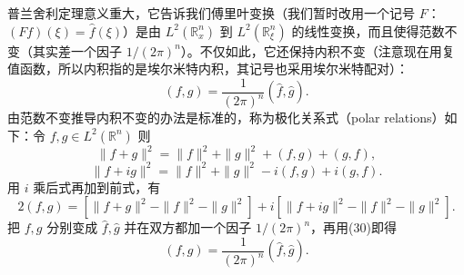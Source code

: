 普兰舍利定理意义重大，它告诉我们傅里叶变换（我们暂时改用一个记号 $F$：$(Ff)(\xi)=\widehat f(\xi)$）是由 $L^2(\mathbb R_x^n)$ 到 $L^2(\mathbb R_\xi^n)$ 的线性变换，而且使得范数不变（其实差一个因子 $1/(2\pi)^n$）。不仅如此，它还保持内积不变（注意现在用复值函数，所以内积指的是埃尔米特内积，其记号也采用埃尔米特配对）：
\begin{equation}
 (f,g)=\frac1{(2\pi)^n}(\widehat f,\widehat g).
 \tag{31}
\end{equation}
由范数不变推导内积不变的办法是标准的，称为极化关系式（polar relations）如下：令 $f,g\in L^2(\mathbb R^n)$ 则
\[
 \|f+g\|^2=\|f\|^2+\|g\|^2+(f,g)+(g,f),
\]
\[
 \|f+ig\|^2=\|f\|^2+\|g\|^2-i(f,g)+i(g,f).
\]
用 $i$ 乘后式再加到前式，有
\[
 2(f,g)=[\|f+g\|^2-\|f\|^2-\|g\|^2]
 +i[\|f+ig\|^2-\|f\|^2-\|g\|^2].
\]
把 $f,g$ 分别变成 $\widehat f,\widehat g$ 并在双方都加一个因子 $1/(2\pi)^n$，再用(30)即得
\[
 (f,g)=\frac1{(2\pi)^n}(\widehat f,\widehat g).
\]

